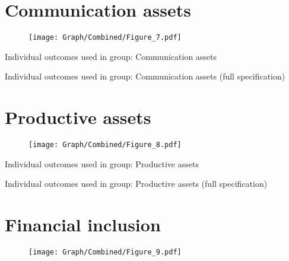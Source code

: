 \documentclass[10pt,a4paper]{article}
\begin{document}
\section{Communication assets}
\begin{table}[H]\centering

\end{table}
\begin{figure}[H]\centering
\texttt{[image: Graph/Combined/Figure\_7.pdf]}
\caption{} \label{fig:Fig_7}
\end{figure}

\begin{table}[H]\centering\caption{Individual outcomes used in group: Communication assets }
\resizebox{\textwidth}{!}{}
\end{table}
\begin{table}[H]\centering\caption{Individual outcomes used in group: Communication assets (full specification)}
\resizebox{\textwidth}{!}{}
\end{table}
\pagebreak
\section{Productive assets}
\begin{table}[H]\centering

\end{table}
\begin{figure}[H]\centering
\texttt{[image: Graph/Combined/Figure\_8.pdf]}
\caption{} \label{fig:Fig_8}
\end{figure}

\begin{table}[H]\centering\caption{Individual outcomes used in group: Productive assets }
\resizebox{\textwidth}{!}{}
\end{table}
\begin{table}[H]\centering\caption{Individual outcomes used in group: Productive assets (full specification)}
\resizebox{\textwidth}{!}{}
\end{table}
\pagebreak
\section{Financial inclusion}
\begin{table}[H]\centering

\end{table}
\begin{figure}[H]\centering
\texttt{[image: Graph/Combined/Figure\_9.pdf]}
\caption{} \label{fig:Fig_9}
\end{figure}
\end{document}
